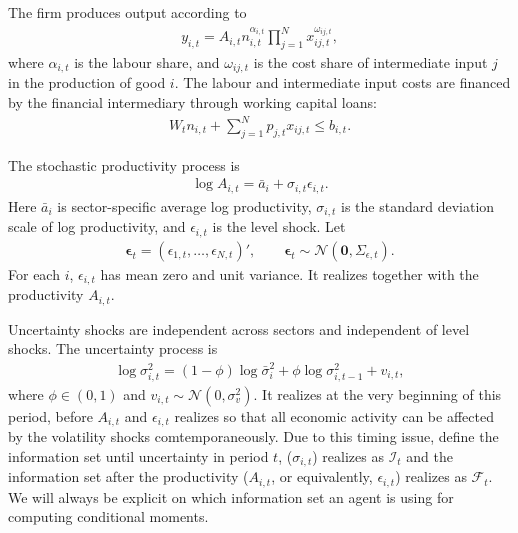 \documentclass[12pt]{article}
\numberwithin{equation}{section}
\begin{document}
The firm produces output according to
\begin{align}\label{eq:firm_prod_fcn}
    y_{i,t} = A_{i,t} n_{i,t}^{\alpha_{i,t}} \prod_{j=1}^N x_{ij,t}^{\omega_{ij,t}},
\end{align}
where $\alpha_{i,t}$ is the labour share, and $\omega_{ij,t}$ is the cost share of intermediate input $j$ in the production of good $i$. The labour and intermediate input costs are financed by the financial intermediary through working capital loans:
\begin{align}\label{eq:working_capital_constraint}
    W_t n_{i,t} + \sum_{j=1}^N p_{j,t} x_{ij,t} \leq  b_{i,t}.
\end{align}

The stochastic productivity process is
\begin{align}\label{eq:firm_productivity}
    \log A_{i,t}
    =
    \bar a_i
    +
    \sigma_{i,t}\epsilon_{i,t}.
\end{align}
Here $\bar a_i$ is sector-specific average log productivity, $\sigma_{i,t}$ is the standard deviation scale of log productivity, and $\epsilon_{i,t}$ is the level shock. Let
\begin{align*}
    \boldsymbol\epsilon_t
    =
    (\epsilon_{1,t},\ldots,\epsilon_{N,t})',
    \qquad
    \boldsymbol\epsilon_t
    \sim
    \mathcal N(\mathbf 0,\Sigma_{\epsilon,t}).
\end{align*}
For each $i$, $\epsilon_{i,t}$ has mean zero and unit variance. It realizes together with the productivity $A_{i,t}$.

Uncertainty shocks are independent across sectors and independent of level shocks. The uncertainty process is
\begin{align}\label{eq:uncertainty_shock_process}
    \log\sigma^2_{i,t}
    =
    (1-\phi)\log\bar\sigma_i^2
    +
    \phi\log\sigma^2_{i,t-1}
    +
    v_{i,t},
\end{align}
where $\phi\in(0,1)$ and $v_{i,t}\sim\mathcal N(0,\sigma_v^2)$. It realizes at the very beginning of this period, before $A_{i,t}$ and $\epsilon_{i,t}$ realizes so that all economic activity can be affected by the volatility shocks comtemporaneously. Due to this timing issue, define the information set until uncertainty in period $t$, ($\sigma_{i,t}$) realizes as $\mathcal{I}_t$ and the information set after the productivity ($A_{i,t}$, or equivalently, $\epsilon_{i,t}$) realizes as $\mathcal{F}_t$. We will always be explicit on which information set an agent is using for computing conditional moments.
\end{document}
